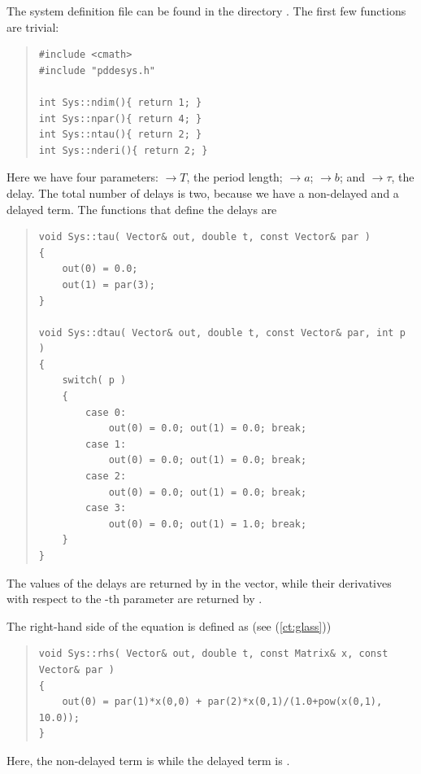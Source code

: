 \documentclass[10pt,a4paper]{ddedoc}
\begin{document}
The system definition file can be found in the directory
. The first few functions are trivial:
{ \small \begin{quote} \begin{lstlisting}[frame=single]
#include <cmath> 
#include "pddesys.h"

int Sys::ndim(){ return 1; }
int Sys::npar(){ return 4; }
int Sys::ntau(){ return 2; }
int Sys::nderi(){ return 2; }
\end{lstlisting} \end{quote} } \noindent
Here we have four parameters:
$\to T$, the period length;
$\to a$;
$\to b$; and
$\to \tau$, the delay.
The total number of delays is two, because we have a non-delayed and a delayed term.
The functions that define the delays are
{ \small \begin{quote} \begin{lstlisting}[frame=single]
void Sys::tau( Vector& out, double t, const Vector& par ) 
{
	out(0) = 0.0;
	out(1) = par(3);
}

void Sys::dtau( Vector& out, double t, const Vector& par, int p ) 
{
	switch( p ) 
	{
		case 0:
			out(0) = 0.0; out(1) = 0.0; break;
		case 1: 
			out(0) = 0.0; out(1) = 0.0; break;
		case 2:
			out(0) = 0.0; out(1) = 0.0; break;
		case 3:
			out(0) = 0.0; out(1) = 1.0; break;
	}
}
\end{lstlisting} \end{quote} } \noindent
The values of the delays are returned by  in the  vector, while their derivatives with respect to the -th parameter are returned by .

The right-hand side of the equation is defined as (see (\ref{ct:glass}))
{ \small \begin{quote} \begin{lstlisting}[frame=single]
void Sys::rhs( Vector& out, double t, const Matrix& x, const Vector& par )
{
	out(0) = par(1)*x(0,0) + par(2)*x(0,1)/(1.0+pow(x(0,1), 10.0));
}
\end{lstlisting} \end{quote} } \noindent
Here, the non-delayed term is  while the delayed term
is .
\end{document}
